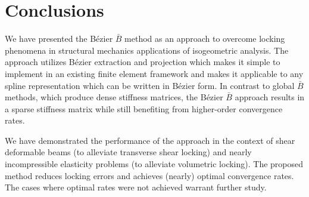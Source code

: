 \documentclass{article}
\newcommand{\Bezier}{{B\'{e}zier} }
\begin{document}
\section{Conclusions}
\label{sec:conclusion}

We have presented the B\'{e}zier $\bar{B}$ method as an approach to overcome locking phenomena in structural mechanics applications of isogeometric analysis. The approach utilizes B\'ezier extraction and projection which makes it simple to implement in an existing finite element framework and makes it applicable to any spline representation which can be written in \Bezier form. In contrast to global $\bar{B}$ methods, which produce dense stiffness matrices, the B\'ezier $\bar{B}$ approach results in a sparse stiffness matrix while still benefiting from higher-order convergence rates.

We have demonstrated the performance of the approach in the context of shear deformable beams (to alleviate transverse shear locking) and nearly incompressible elasticity problems (to alleviate volumetric locking). The proposed method reduces locking errors and achieves (nearly) optimal convergence rates. The cases where optimal rates were not achieved warrant further study.


\end{document}
